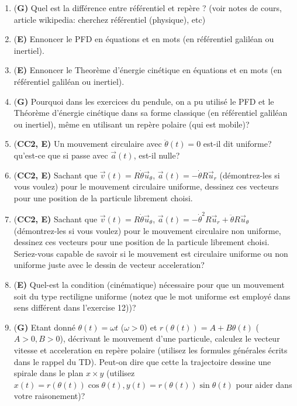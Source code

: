 \documentclass[french,12pt]{article}
\begin{document}
\begin{enumerate}
\item {(\bf G)} Quel est la différence entre référentiel et repère ? (voir notes de cours, article wikipedia: cherchez référentiel (physique), etc)
\item {(\bf E)} Ennoncer le PFD en équations et en mots (en référentiel galiléan ou inertiel). 
\item {(\bf E)} Ennoncer le Theorème d'énergie cinétique en équations et en mots (en référentiel galiléan ou inertiel).
\item {(\bf G)} Pourquoi dans les exercices du pendule, on a pu utilisé le PFD et le Théorème d'énergie cinétique dans sa forme classique (en référentiel galiléan ou inertiel), même en utilisant un repère polaire (qui est mobile)?  
\item {(\bf CC2, E)} Un mouvement circulaire avec $\ddot{\theta}(t) = 0$ est-il dit uniforme? qu'est-ce que si passe avec $\Vec{a}(t)$, est-il nulle?
\item {(\bf CC2, E)} Sachant que $\Vec{v}(t) = R\dot{\theta} \Vec{u}_{\theta}$, $\Vec{a}(t) = - \dot{\theta} R \Vec{u}_r$ (démontrez-les si vous voulez) pour le mouvement circulaire uniforme, dessinez ces vecteurs pour une position de la particule librement choisi.
\item {(\bf CC2, E)} Sachant que $\Vec{v}(t) = R\dot{\theta} \Vec{u}_{\theta}$, $\Vec{a}(t) = - \dot{\theta}^2 R \Vec{u}_r + \ddot{\theta} R \Vec{u}_{\theta}$ (démontrez-les si vous voulez) pour le mouvement circulaire non uniforme, dessinez ces vecteurs pour une position de la particule librement choisi. Seriez-vous capable de savoir si le mouvement est circulaire uniforme ou non uniforme juste avec le dessin de vecteur acceleration?
\item {(\bf E)} Quel-est la condition (cinématique) nécessaire pour que un mouvement soit du type rectiligne uniforme (notez que le mot uniforme est employé dans sens différent dans l'exercise 12))? 
 
\item {(\bf G)} Etant donné $\theta(t) = \omega t$ ($\omega >0$) et $r(\theta(t)) = A + B \theta(t)$ ($A>0, B>0$), décrivant le mouvement d'une particule, calculez le vecteur vitesse et acceleration en repère polaire (utilisez les formules générales écrits dans le rappel du TD). Peut-on dire que cette la trajectoire dessine une spirale dans le plan $x \times y$ (utilisez $x(t) = r(\theta(t)) \cos \theta(t), y(t) =  r(\theta(t)) \sin \theta(t)$ pour aider dans votre raisonement)? 



\end{enumerate}
\end{document}
